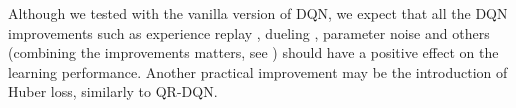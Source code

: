 Although we tested with the vanilla version of DQN, we expect that all the DQN improvements such as experience replay \citep{hessel2017rainbow}, dueling \citep{wang2015dueling}, parameter noise \citep{plappert2017parameter} and others (combining the improvements matters, see \citep{hessel2017rainbow}) should have a positive effect on the learning performance. Another practical improvement may be the introduction of Huber loss, similarly to QR-DQN.

